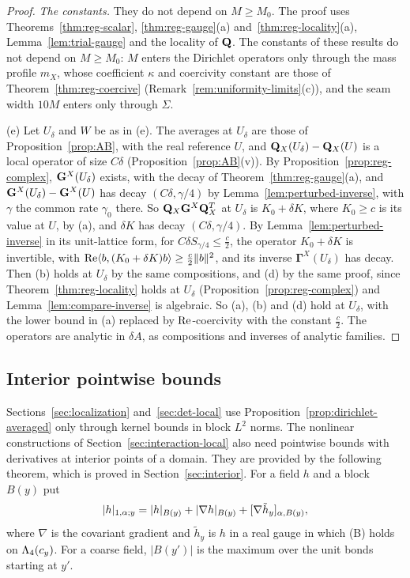 \begin{proof}
\emph{The constants.} They do not depend on $M\ge M_0$. The proof uses Theorems~\ref{thm:reg-scalar}, \ref{thm:reg-gauge}(a) and~\ref{thm:reg-locality}(a), Lemma~\ref{lem:trial-gauge} and the locality of $\mathbf Q$. The constants of these results do not depend on $M\ge M_0$: $M$ enters the Dirichlet operators only through the mass profile $m_X$, whose coefficient $\kappa$ and coercivity constant are those of Theorem~\ref{thm:reg-coercive} (Remark~\ref{rem:uniformity-limits}(c)), and the seam width $10M$ enters only through $\Sigma$.

(e) Let $U_\delta$ and $W$ be as in (e). The averages at $U_\delta$ are those of Proposition~\ref{prop:AB}, with the real reference $U$, and $\mathbf Q_X(U_\delta)-\mathbf Q_X(U)$ is a local operator of size $C\delta$ (Proposition~\ref{prop:AB}(v)). By Proposition~\ref{prop:reg-complex}, $\mathbf G^X(U_\delta)$ exists, with the decay of Theorem~\ref{thm:reg-gauge}(a), and $\mathbf G^X(U_\delta)-\mathbf G^X(U)$ has decay $(C\delta,\gamma/4)$ by Lemma~\ref{lem:perturbed-inverse}, with $\gamma$ the common rate $\gamma_0$ there. So $\mathbf Q_X\mathbf G^X\mathbf Q_X^T$ at $U_\delta$ is $K_0+\delta K$, where $K_0\ge c$ is its value at $U$, by (a), and $\delta K$ has decay $(C\delta,\gamma/4)$. By Lemma~\ref{lem:perturbed-inverse} in its unit-lattice form, for $C\delta S_{\gamma/4}\le\frac c2$, the operator $K_0+\delta K$ is invertible, with $\operatorname{Re}\langle b,(K_0+\delta K)b\rangle\ge\frac c2\|b\|^2$, and its inverse $\boldsymbol\Gamma^X(U_\delta)$ has decay. Then (b) holds at $U_\delta$ by the same compositions, and (d) by the same proof, since Theorem~\ref{thm:reg-locality} holds at $U_\delta$ (Proposition~\ref{prop:reg-complex}) and Lemma~\ref{lem:compare-inverse} is algebraic. So (a), (b) and (d) hold at $U_\delta$, with the lower bound in (a) replaced by $\operatorname{Re}$-coercivity with the constant $\frac c2$. The operators are analytic in $\delta\!A$, as compositions and inverses of analytic families.
\end{proof}


\subsection{Interior pointwise bounds}

Sections~\ref{sec:localization} and~\ref{sec:det-local} use Proposition~\ref{prop:dirichlet-averaged} only through kernel bounds in block $L^2$ norms. The nonlinear constructions of Section~\ref{sec:interaction-local} also need pointwise bounds with derivatives at interior points of a domain. They are provided by the following theorem, which is proved in Section~\ref{sec:interior}. For a field $h$ and a block $B(y)$ put
\[
|h|_{1,\alpha;y}=|h|_{B(y)}+|\nabla h|_{B(y)}+[\nabla\tilde h_y]_{\alpha,B(y)},
\]
where $\nabla$ is the covariant gradient and $\tilde h_y$ is $h$ in a real gauge in which (B) holds on $\Lambda_4(c_y)$. For a coarse field, $|B(y')|$ is the maximum over the unit bonds starting at $y'$.

